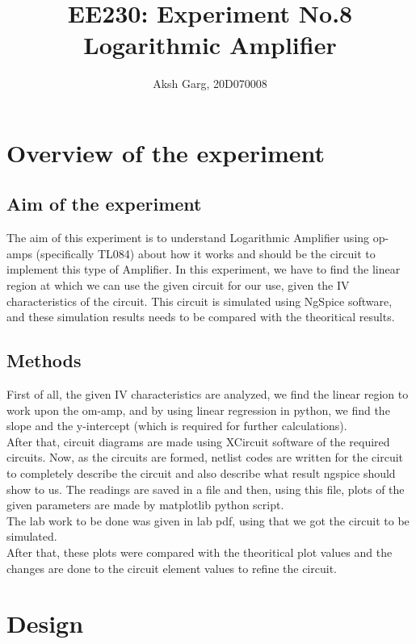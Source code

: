 \documentclass[12pt]{article}
\title{EE230: Experiment No.8\\
Logarithmic Amplifier}
\author{Aksh Garg, 20D070008}
\begin{document}
\maketitle
 

\section{Overview of the experiment} %

\subsection{Aim of the experiment}%

The aim of this experiment is to understand Logarithmic Amplifier using op-amps (specifically TL084) about how it works and should be the circuit to implement this type of Amplifier. In this experiment, we have to find the linear region at which we can use the given circuit for our use, given the IV characteristics of the circuit. This circuit is simulated using NgSpice software, and these simulation results needs to be compared with the theoritical results.

\subsection{Methods}
First of all, the given IV characteristics are analyzed, we find the linear region to work upon the om-amp, and by using linear regression in python, we find the slope and the y-intercept (which is required for further calculations).\\
After that, circuit diagrams are made using XCircuit software of the required circuits. Now, as the circuits are formed, netlist codes are written for the circuit to completely describe the circuit and also describe what result ngspice should show to us. The readings are saved in a file and then, using this file, plots of the given parameters are made by matplotlib python script.\\
The lab work to be done was given in lab pdf, using that we got the circuit to be simulated.\\
After that, these plots were compared with the theoritical plot values and the changes are done to the circuit element values to refine the circuit.

\section{Design}%
\end{document}
